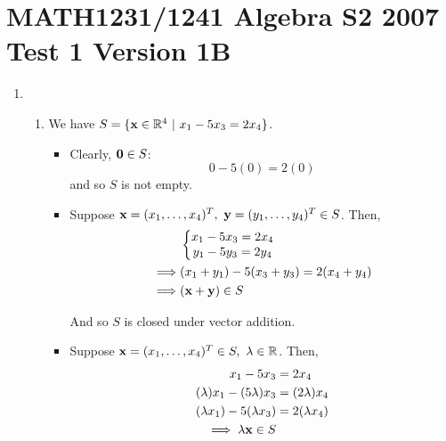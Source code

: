 \section*{MATH1231/1241 Algebra S2 2007 Test 1 Version 1B}
\begin{enumerate}
    \item
        \begin{enumerate}
            \item 
                We have $S = \{\mathbf{x} \in \mathbb{R}^4 ~|~ x_1 - 5x_3 = 2x_4\}$.

                \begin{itemize}
                    \item
                        Clearly, $\mathbf{0} \in S$:
                        $$0 - 5(0) = 2(0)$$
                        and so $S$ is not empty.

                    \item
                        Suppose $\mathbf{x} = (x_1, \dots, x_4)^T,~
                        \mathbf{y} = (y_1, \dots, y_4)^T \in S$. Then,
                        \begin{align*}
                            &\left\{\begin{matrix}
                                x_1 - 5x_3 = 2x_4 \\
                                y_1 - 5y_3 = 2y_4
                            \end{matrix}\right. \\
                            \implies
                            &(x_1 + y_1) - 5(x_3 + y_3) = 2(x_4 + y_4) \\
                            \implies
                            &(\mathbf{x} + \mathbf{y}) \in S
                        \end{align*}

                        And so $S$ is closed under vector addition.

                    \item
                        Suppose $\mathbf{x} = (x_1, \dots, x_4)^T \in S,~ \lambda \in \mathbb{R}$.
                        Then,
                        \begin{align*}
                            x_1 - 5x_3 &= 2x_4 \\
                            (\lambda)x_1 - (5\lambda)x_3 &= (2\lambda)x_4 \\
                            (\lambda x_1) - 5(\lambda x_3) &= 2(\lambda x_4) \\
                            \implies
                            \lambda \mathbf{x} \in S
                        \end{align*}


\end{itemize}
\end{enumerate}
\end{enumerate}

